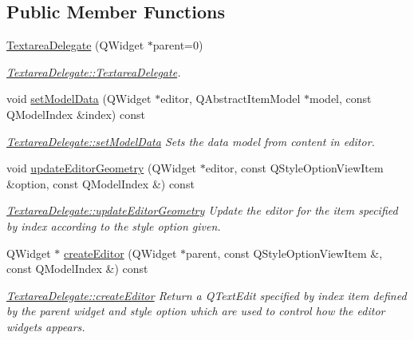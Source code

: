\subsection*{Public Member Functions}
\begin{DoxyCompactItemize}
\item 
\hyperlink{classGui_1_1Widgets_1_1Delegates_1_1TextareaDelegate_a2dfb77334f4a12a031bed33ac5df9f5c}{Textarea\+Delegate} (Q\+Widget $\ast$parent=0)
\begin{DoxyCompactList}\small\item\em \hyperlink{classGui_1_1Widgets_1_1Delegates_1_1TextareaDelegate_a2dfb77334f4a12a031bed33ac5df9f5c}{Textarea\+Delegate\+::\+Textarea\+Delegate}. \end{DoxyCompactList}\item 
void \hyperlink{classGui_1_1Widgets_1_1Delegates_1_1TextareaDelegate_a67f7736e4cc6a6f9e2841584b4f48b25}{set\+Model\+Data} (Q\+Widget $\ast$editor, Q\+Abstract\+Item\+Model $\ast$model, const Q\+Model\+Index \&index) const 
\begin{DoxyCompactList}\small\item\em \hyperlink{classGui_1_1Widgets_1_1Delegates_1_1TextareaDelegate_a67f7736e4cc6a6f9e2841584b4f48b25}{Textarea\+Delegate\+::set\+Model\+Data} Sets the data model from content in editor. \end{DoxyCompactList}\item 
void \hyperlink{classGui_1_1Widgets_1_1Delegates_1_1TextareaDelegate_aca8f707d0638a3c0f1b6c200729b62c4}{update\+Editor\+Geometry} (Q\+Widget $\ast$editor, const Q\+Style\+Option\+View\+Item \&option, const Q\+Model\+Index \&) const 
\begin{DoxyCompactList}\small\item\em \hyperlink{classGui_1_1Widgets_1_1Delegates_1_1TextareaDelegate_aca8f707d0638a3c0f1b6c200729b62c4}{Textarea\+Delegate\+::update\+Editor\+Geometry} Update the {\itshape editor} for the item specified by {\itshape index} according to the style {\itshape option} given. \end{DoxyCompactList}\item 
Q\+Widget $\ast$ \hyperlink{classGui_1_1Widgets_1_1Delegates_1_1TextareaDelegate_ac206e0bf0a439e5fa781282aea864cd7}{create\+Editor} (Q\+Widget $\ast$parent, const Q\+Style\+Option\+View\+Item \&, const Q\+Model\+Index \&) const 
\begin{DoxyCompactList}\small\item\em \hyperlink{classGui_1_1Widgets_1_1Delegates_1_1TextareaDelegate_ac206e0bf0a439e5fa781282aea864cd7}{Textarea\+Delegate\+::create\+Editor} Return a Q\+Text\+Edit specified by {\itshape index} item defined by the {\itshape parent} widget and style {\itshape option} which are used to control how the editor widgets appears. \end{DoxyCompactList}\item 

\end{DoxyCompactItemize}
